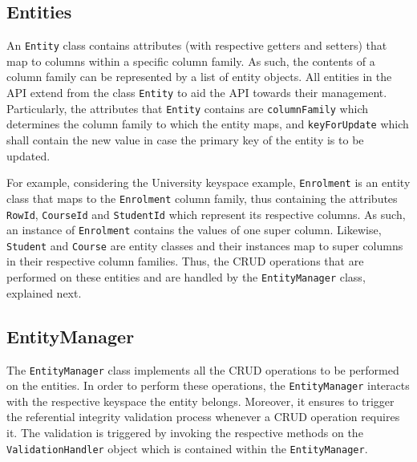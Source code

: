 	\subsection{Entities} 
	
	An \texttt{Entity} class contains attributes (with respective getters and
	setters) that map to columns within a specific column family.  As such,  the contents of a
	column family can be represented by a list of entity objects.  All entities in
	the \ac{API} extend from the class \texttt{Entity}  to
	aid the \ac{API} towards their management.  Particularly,  the attributes
	that \texttt{Entity} contains  are \texttt{columnFamily} which
	determines the column family to which the entity maps,  and 
	\texttt{keyForUpdate} which shall contain the new value in case the primary key
	of the entity is to be updated. 
	
	For example,   considering the University keyspace example,  \texttt{Enrolment} 
	is an entity class that  maps to the \texttt{Enrolment}  column family,  thus
	containing the attributes \texttt{RowId},  \texttt{CourseId} and
	\texttt{StudentId} which represent its respective columns.  As such,  an
	instance of \texttt{Enrolment} contains the values of one super column.  Likewise, 
	\texttt{Student} and \texttt{Course} are entity classes and their instances 
	map to   super columns in their respective column families. 
	Thus, the \ac{CRUD} operations that are performed on these entities  and are
	handled by the \texttt{EntityManager} class, explained next. 
		 
	\subsection{EntityManager} \label{ss:Implementation-API-EntityManager}

	The  \texttt{EntityManager} class implements  all
	the \ac{CRUD} operations to be performed on the entities.  In order to perform
	these operations,   the \texttt{EntityManager} interacts with the respective
	keyspace the entity belongs.  Moreover,  it ensures to trigger the   referential
	integrity validation process whenever a \ac{CRUD} operation requires it. The
	validation is triggered by invoking the respective methods on the  
	\texttt{ValidationHandler} object which is contained within the
	\texttt{EntityManager}.
	
